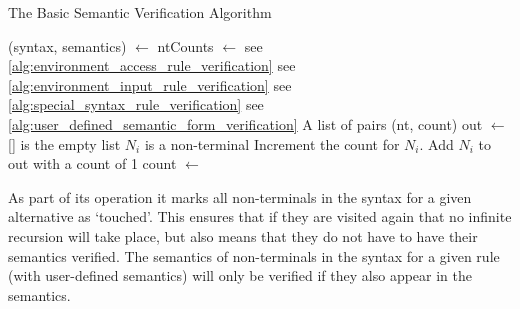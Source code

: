 \begin{breakablealgorithm}
\caption{The Basic Semantic Verification Algorithm}
\label{alg:the_basic_semantic_verification_algorithm}
\begin{algorithmic}
    \State (syntax, semantics) $\gets$ 
    \State ntCounts $\gets$ 
        \State {}
    \EndFor
    \State
        \State {}
        \LineComment see \autoref{alg:environment_access_rule_verification}
        \State {}
        \LineComment see \autoref{alg:environment_input_rule_verification}
        \State {}
        \LineComment see \autoref{alg:special_syntax_rule_verification}
        \State {}
        \LineComment see \autoref{alg:user_defined_semantic_form_verification}
    \EndIf
\EndFunction
\State
{}
\Comment A list of pairs (nt, count)
    \State out $\gets$ []
    \Comment [] is the empty list
        \Comment $N_i$ is a non-terminal
            \State Increment the count for $N_i$.
        \Else
            \State Add $N_i$ to out with a count of 1
        \EndIf
    \EndFor
    \State {}
\EndFunction
\State
{}
    \State count $\gets$ 
        \State {}
    \Else
        \State {}
    \EndIf
\EndFunction
\end{algorithmic}
\end{breakablealgorithm}

As part of its operation it marks all non-terminals in the syntax for a given alternative as `touched'.
This ensures that if they are visited again that no infinite recursion will take place, but also means that they do not have to have their semantics verified.
The semantics of non-terminals in the syntax for a given rule (with user-defined semantics) will only be verified if they also appear in the semantics.

